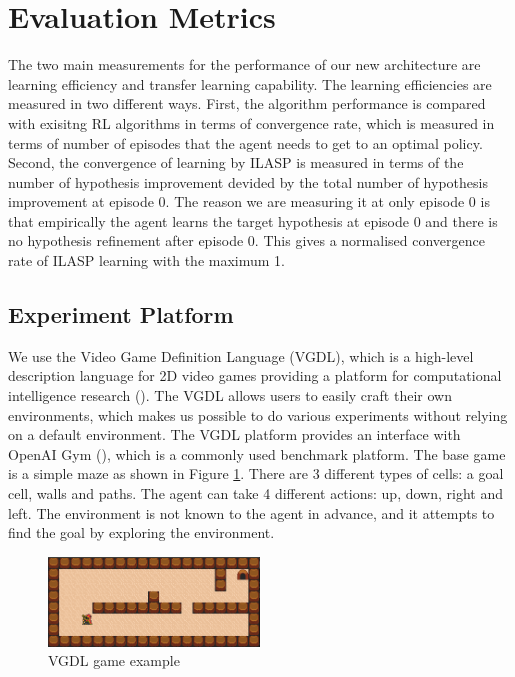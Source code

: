 \section{Evaluation Metrics}

The two main measurements for the performance of our new architecture are learning efficiency and transfer learning capability.
The learning efficiencies are measured in two different ways. First, the algorithm performance is compared with exisitng RL algorithms in terms of
convergence rate, which is measured in terms of number of episodes that the agent needs to get to an optimal policy.
Second, the convergence of learning by ILASP is measured in terms of the number of hypothesis improvement devided by the total number of hypothesis improvement at episode 0.
The reason we are measuring it at only episode 0 is that empirically the agent learns the target hypothesis at episode 0 and there is no hypothesis refinement after episode 0. 
This gives a normalised convergence rate of ILASP learning with the maximum 1. 


\subsection{Experiment Platform}
We use the Video Game Definition Language (VGDL), which is a high-level description language for 2D video games providing a platform for computational intelligence research (\cite{Schaul2013}).
The VGDL allows users to easily craft their own environments, which makes us possible to do various experiments without relying on a default environment. The VGDL platform provides an interface with OpenAI Gym (\cite{Brockman2016}), which is a commonly used benchmark platform. 
The base game is a simple maze as shown in Figure \ref{VGDL_sample}.
There are 3 different types of cells: a goal cell, walls and paths. The agent can take 4 different actions: up, down, right and left.
The environment is not known to the agent in advance, and it attempts to find the goal by exploring the environment.

\begin{figure}[!ht!b]
    \centering
    \includegraphics[width=0.5\textwidth]{./figures/experiment1}
    \caption{VGDL game example}
    \label{VGDL_sample}
    \end{figure}    
